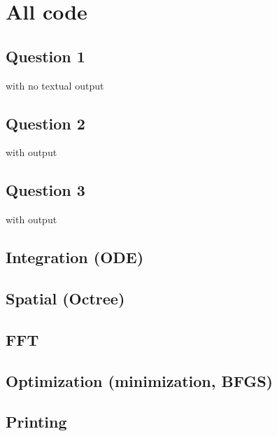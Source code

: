 \newpage
\section{All code}
\subsection{Question 1}

with no textual output

\subsection{Question 2}

with output


\subsection{Question 3}

with output


\subsection{Integration (ODE)}


\subsection{Spatial (Octree)}


\subsection{FFT}


\subsection{Optimization (minimization, BFGS)}


\subsection{Printing}
